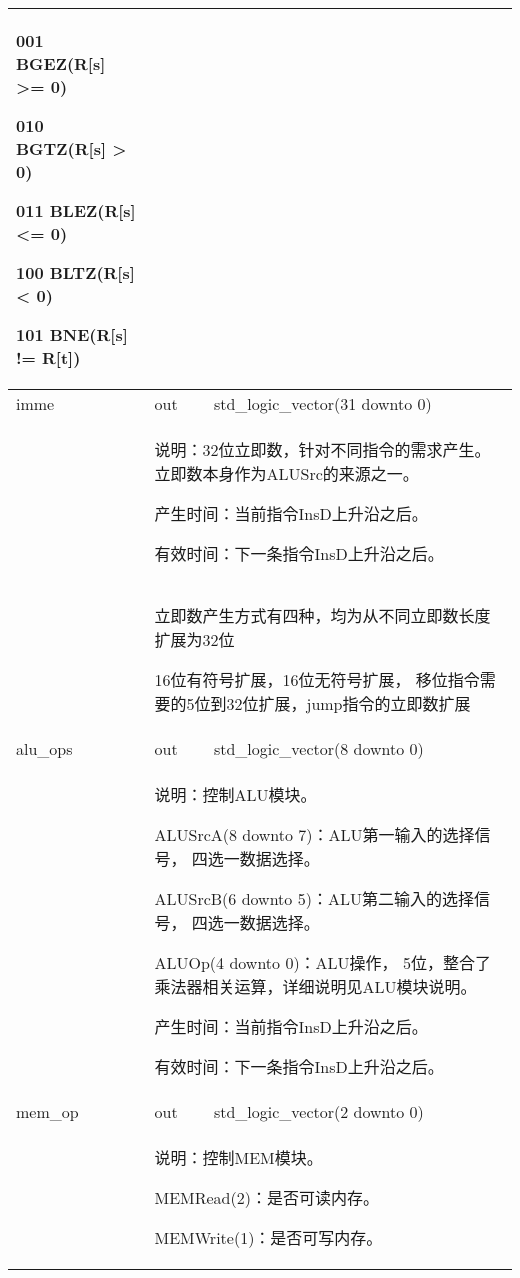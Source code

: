 \begin{tabularx}{\textwidth}{lll}
{                001 BGEZ(R[s] >= 0)

                010 BGTZ(R[s] > 0)

                011 BLEZ(R[s] <= 0)

                100 BLTZ(R[s] < 0)

                101 BNE(R[s] != R[t])
            } \\
            \midrule
            imme            & out       & std\_logic\_vector(31 downto 0) \\
            \cmidrule(l){2-3}
            &
            \multicolumn{2}{X}{
                说明：32位立即数，针对不同指令的需求产生。%
                立即数本身作为ALUSrc的来源之一。

                产生时间：当前指令InsD上升沿之后。

                有效时间：下一条指令InsD上升沿之后。 
            } \\
            &
            \multicolumn{2}{X}{
                立即数产生方式有四种，均为从不同立即数长度扩展为32位

                16位有符号扩展，16位无符号扩展，
                移位指令需要的5位到32位扩展，jump指令的立即数扩展
            } \\
            \midrule
            alu\_ops        & out       & std\_logic\_vector(8 downto 0) \\
            \cmidrule(l){2-3}
            &
            \multicolumn{2}{X}{
                说明：控制ALU模块。

                ALUSrcA(8 downto 7)：ALU第一输入的选择信号，%
                四选一数据选择。

                ALUSrcB(6 downto 5)：ALU第二输入的选择信号，%
                四选一数据选择。

                ALUOp(4 downto 0)：ALU操作，%
                5位，整合了乘法器相关运算，详细说明见ALU模块说明。

                产生时间：当前指令InsD上升沿之后。

                有效时间：下一条指令InsD上升沿之后。 
            } \\
            \midrule
            mem\_op         & out       & std\_logic\_vector(2 downto 0) \\
            \cmidrule(l){2-3}
            &
            \multicolumn{2}{X}{
                说明：控制MEM模块。

                MEMRead(2)：是否可读内存。

                MEMWrite(1)：是否可写内存。

}
\end{tabularx}
